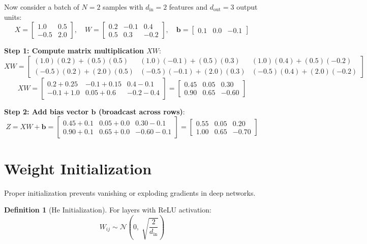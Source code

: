 \documentclass[12pt, a4paper]{report}
\theoremstyle{definition}
\newtheorem{definition}{Definition}[chapter]
\begin{document}
\begin{numexample}[Batch Processing with $N=2$ Samples]
Now consider a batch of $N=2$ samples with $d_\text{in} = 2$ features and $d_\text{out} = 3$ output units:
\[
X = \begin{bmatrix} 1.0 & 0.5 \\ -0.5 & 2.0 \end{bmatrix}, \quad
W = \begin{bmatrix} 0.2 & -0.1 & 0.4 \\ 0.5 & 0.3 & -0.2 \end{bmatrix}, \quad
\mathbf{b} = \begin{bmatrix} 0.1 & 0.0 & -0.1 \end{bmatrix}
\]

\textbf{Step 1: Compute matrix multiplication $X W$}:
\[
X W = \begin{bmatrix} 
(1.0)(0.2) + (0.5)(0.5) & (1.0)(-0.1) + (0.5)(0.3) & (1.0)(0.4) + (0.5)(-0.2) \\
(-0.5)(0.2) + (2.0)(0.5) & (-0.5)(-0.1) + (2.0)(0.3) & (-0.5)(0.4) + (2.0)(-0.2)
\end{bmatrix}
\]
\[
X W = \begin{bmatrix} 
0.2 + 0.25 & -0.1 + 0.15 & 0.4 - 0.1 \\
-0.1 + 1.0 & 0.05 + 0.6 & -0.2 - 0.4
\end{bmatrix} = \begin{bmatrix} 0.45 & 0.05 & 0.30 \\ 0.90 & 0.65 & -0.60 \end{bmatrix}
\]

\textbf{Step 2: Add bias vector $\mathbf{b}$ (broadcast across rows)}:
\[
Z = X W + \mathbf{b} = \begin{bmatrix} 0.45+0.1 & 0.05+0.0 & 0.30-0.1 \\ 0.90+0.1 & 0.65+0.0 & -0.60-0.1 \end{bmatrix} = \boxed{\begin{bmatrix} 0.55 & 0.05 & 0.20 \\ 1.00 & 0.65 & -0.70 \end{bmatrix}}
\]
\end{numexample}

\section{Weight Initialization}

Proper initialization prevents vanishing or exploding gradients in deep networks.

\begin{definition}[He Initialization]
For layers with ReLU activation:
\begin{equation}
    W_{ij} \sim \mathcal{N}\left(0,\; \sqrt{\frac{2}{d_\text{in}}}\right)
\end{equation}
\end{definition}
\end{document}
